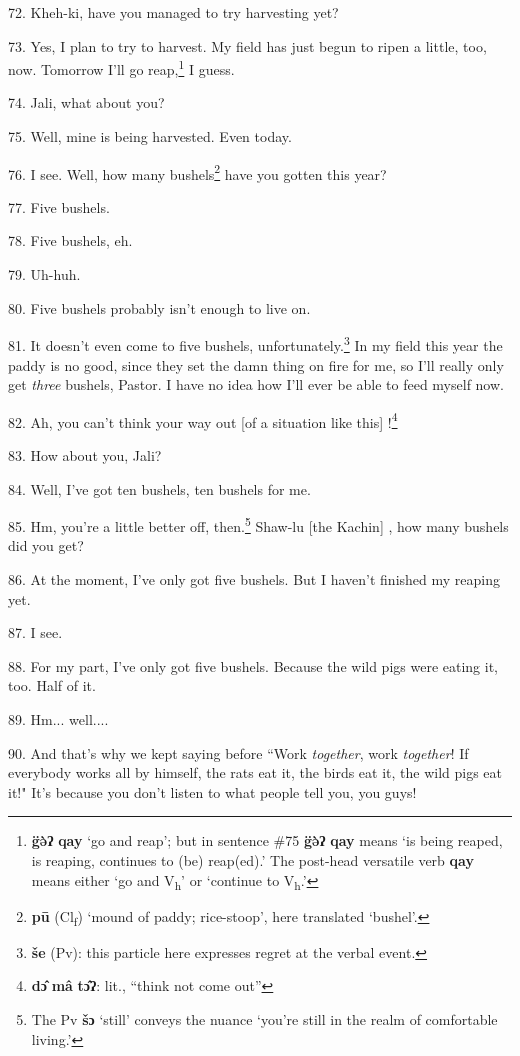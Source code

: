 72. Kheh-ki, have you managed to try harvesting yet?

73. Yes, I plan to try to harvest. My field has just begun to ripen a little, too,
now. Tomorrow I'll go reap,\footnote{\textbf{g̈ə̀ʔ} \textbf{qay} `go and reap'; but in sentence \#75 \textbf{g̈ə̀ʔ} \textbf{qay} means `is being reaped, is reaping, continues to (be) reap(ed).' The post-head versatile verb \textbf{qay} means either `go and V\textsubscript{h}' or `continue to V\textsubscript{h}.'} I guess.

74. Jali, what about you?

75. Well, mine is being harvested. Even today.

76. I see. Well, how many bushels\footnote{\textbf{pū} (Cl\textsubscript{f}) `mound of paddy; rice-stoop', here translated `bushel'.} have you gotten this year?

77. Five bushels.

78. Five bushels, eh.

79. Uh-huh.

80. Five bushels probably isn't enough to live on.

81. It doesn't even come to five bushels, unfortunately.\footnote{\textbf{še} (Pv): this particle here expresses regret at the verbal event.} In my field this
year the paddy is no good, since they set the damn thing on fire for me, so I'll
really only get \textit{three} bushels, Pastor. I have no idea how I'll ever be
able to feed myself now.

82. Ah, you can't think your way out [of a situation like this] !\footnote{\textbf{dɔ̂} \textbf{mâ} \textbf{tɔ̂ʔ}: lit., ``think not come out''}

83. How about you, Jali?

84. Well, I've got ten bushels, ten bushels for me.

85. Hm, you're a little better off, then.\footnote{The Pv \textbf{šɔ} `still' conveys the nuance `you're still in the realm of comfortable living.'} Shaw-lu [the Kachin] , how many
bushels did you get?

86. At the moment, I've only got five bushels. But I haven't finished my reaping
yet.

87. I see.

88. For my part, I've only got five bushels. Because the wild pigs were eating
it, too. Half of it.

89. Hm... well....

90. And that's why we kept saying before ``Work\textit{ together}, work
\textit{together}! If everybody works all by himself, the rats eat it, the birds
eat it, the wild pigs eat it!" It's because you don't listen to what people
tell you, you guys!

